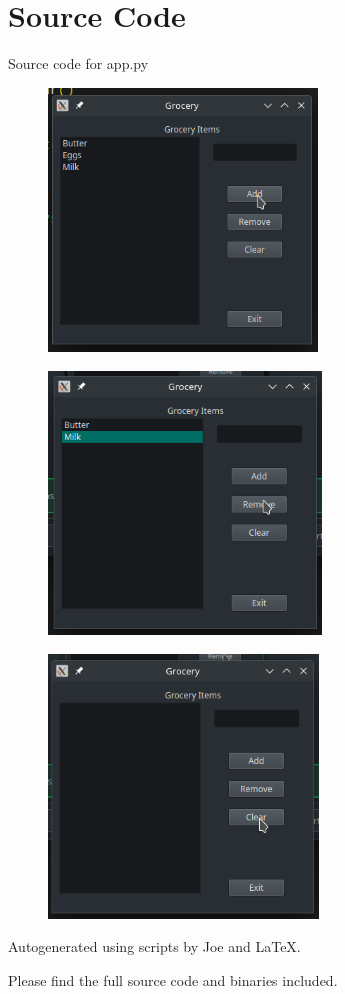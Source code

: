 \documentclass[12pt]{article}
\begin{document}
\maketitle
\pagebreak


\section{Source Code}

Source code for \textsf{app.py}


% 

\newpage

\begin{figure}[H]
  \centering
    \includegraphics[height=7cm]{ex1.png}
\end{figure}

\begin{figure}[H]
  \centering
    \includegraphics[height=7cm]{ex2.png}
\end{figure}

\begin{figure}[H]
  \centering
    \includegraphics[height=7cm]{ex3.png}
\end{figure}

\newpage

Autogenerated using scripts by Joe and \LaTeX.

Please find the full source code and binaries included.
\end{document}
